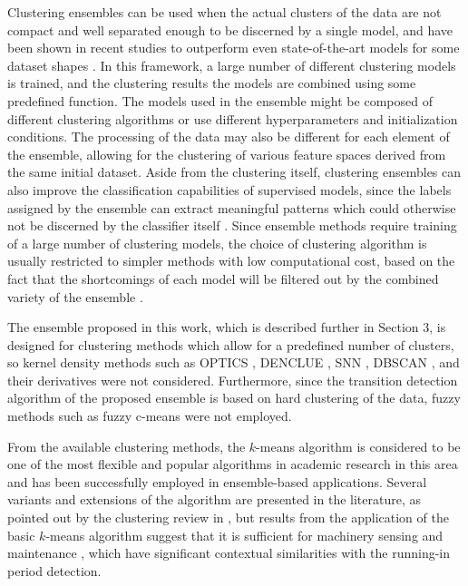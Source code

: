 \documentclass[preprint,11pt,number]{elsarticle}
\begin{document}
\color{red}Clustering ensembles can be used when the actual clusters of the data are not compact and well separated enough to be discerned by a single model, and have been shown in recent studies to outperform even state-of-the-art models for some dataset shapes \cite{Xie2024}. \color{black} In this framework, a large number of different clustering models is trained, and the clustering results the models are combined using some predefined function. The models used in the ensemble might be composed of different clustering algorithms or use different hyperparameters and initialization conditions. The processing of the data may also be different for each element of the ensemble, allowing for the clustering of various feature spaces derived from the same initial dataset. \color{red} Aside from the clustering itself, clustering ensembles can also improve the classification capabilities of supervised models, since the labels assigned by the ensemble can extract meaningful patterns which could otherwise not be discerned by the classifier itself \cite{Nanfak2024}. \color{black} Since ensemble methods require training of a large number of clustering models, the choice of clustering algorithm is usually restricted to simpler methods with low computational cost, based on the fact that the shortcomings of each model will be filtered out by the combined variety of the ensemble \cite{Jain2010, Zhou2012}.

The ensemble proposed in this work, which is described further in Section 3, is designed for clustering methods which allow for a predefined number of clusters, so kernel density methods such as OPTICS \cite{Ankerst1999}, DENCLUE \cite{Hinneburg2007}, SNN \cite{Ertoz2003}, DBSCAN \cite{Ester1996}, and their derivatives \cite{Schubert2017} were not considered. Furthermore, since the transition detection algorithm of the proposed ensemble is based on hard clustering of the data, fuzzy methods such as fuzzy c-means \cite{Bezdek1984} were not employed.

\color{red} From the available clustering methods, the $k$-means algorithm is considered to be one of the most flexible and popular algorithms in academic research in this area and has been successfully employed in ensemble-based applications\cite{Ahmed2020, Bai2020, Dong2020, Lakshmi2024}. \color{black} Several variants and extensions of the algorithm are presented in the literature, as pointed out by the clustering review in \cite{Jain2010}, but results from the application of the basic $k$-means algorithm suggest that it is sufficient for machinery sensing and maintenance \cite{Uhlmann2018}, which have significant contextual similarities with the running-in period detection.
\end{document}
